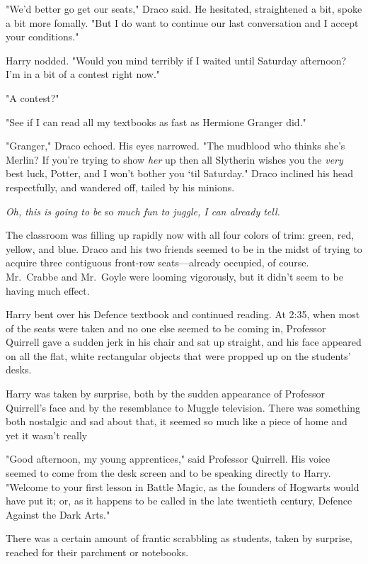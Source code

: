 "We'd better go get our seats," Draco said. He hesitated, straightened a bit,
spoke a bit more fomally. "But I do want to continue our last conversation and
I accept your conditions."

Harry nodded. "Would you mind terribly if I waited until Saturday afternoon?
I'm in a bit of a contest right now."

"A contest?"

"See if I can read all my textbooks as fast as Hermione Granger did."

"Granger," Draco echoed. His eyes narrowed. "The mudblood who thinks she's
Merlin? If you're trying to show \emph{her} up then all Slytherin wishes you
the \emph{very} best luck, Potter, and I won't bother you `til Saturday." Draco
inclined his head respectfully, and wandered off, tailed by his minions.

\emph{Oh, this is going to be} so \emph{much fun to juggle, I can already tell.}

The classroom was filling up rapidly now with all four colors of trim: green,
red, yellow, and blue. Draco and his two friends seemed to be in the midst of
trying to acquire three contiguous front-row seats—already occupied, of
course. Mr.~Crabbe and Mr.~Goyle were looming vigorously, but it didn't seem to
be having much effect.

Harry bent over his Defence textbook and continued reading.
\sbreak
At 2:35\PM, when most of the seats were taken and no one else seemed to be
coming in, Professor Quirrell gave a sudden jerk in his chair and sat up
straight, and his face appeared on all the flat, white rectangular objects that
were propped up on the students' desks.

Harry was taken by surprise, both by the sudden appearance of Professor
Quirrell's face and by the resemblance to Muggle television. There was
something both nostalgic and sad about that, it seemed so much like a piece of
home and yet it wasn't really{\el}

"Good afternoon, my young apprentices," said Professor Quirrell. His voice
seemed to come from the desk screen and to be speaking directly to Harry.
"Welcome to your first lesson in Battle Magic, as the founders of Hogwarts
would have put it; or, as it happens to be called in the late twentieth
century, Defence Against the Dark Arts."

There was a certain amount of frantic scrabbling as students, taken by
surprise, reached for their parchment or notebooks.

